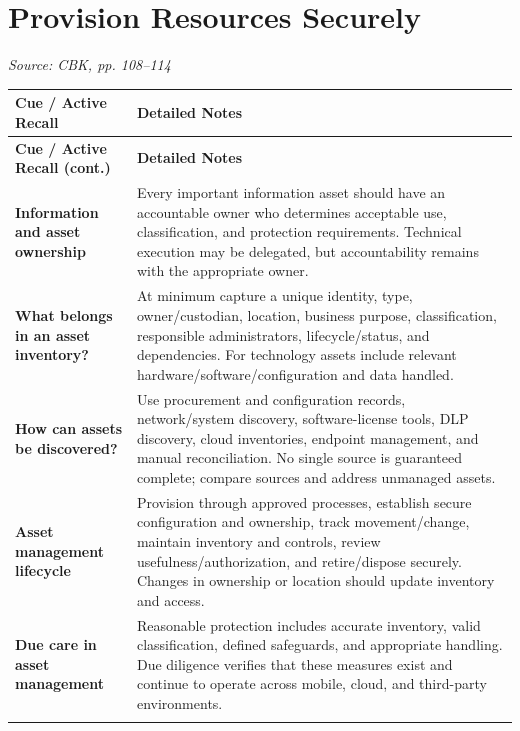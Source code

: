 \documentclass[10pt,letterpaper]{article}
\makeatletter
\newenvironment{cornell}
{\rowcolors{2}{white}{notebg}\begin{longtable}{@{}>{\raggedright\arraybackslash\columncolor{cuebg}\color{navy}\bfseries}p{0.285\textwidth}>{\raggedright\arraybackslash}p{0.65\textwidth}@{}}
\rowcolor{navy}\color{white}\textbf{Cue / Active Recall} & \color{white}\textbf{Detailed Notes}\\ \hline\endfirsthead
\rowcolor{navy}\color{white}\textbf{Cue / Active Recall (cont.)} & \color{white}\textbf{Detailed Notes}\\ \hline\endhead}{\end{longtable}}
\newcommand{\noterow}[2]{#1 & #2\\\arrayrulecolor{line}\hline}
\newcommand{\source}[1]{\par{\footnotesize\color{teal}\textit{Source: CBK, #1}}\par}
\makeatother
\begin{document}
\section{\color{navy}Provision Resources Securely}
\source{pp. 108--114}
\begin{cornell}
\noterow{Information and asset ownership}{Every important information asset should have an accountable owner who determines acceptable use, classification, and protection requirements. Technical execution may be delegated, but accountability remains with the appropriate owner.}
\noterow{What belongs in an asset inventory?}{At minimum capture a unique identity, type, owner/custodian, location, business purpose, classification, responsible administrators, lifecycle/status, and dependencies. For technology assets include relevant hardware/software/configuration and data handled.}
\noterow{How can assets be discovered?}{Use procurement and configuration records, network/system discovery, software-license tools, DLP discovery, cloud inventories, endpoint management, and manual reconciliation. No single source is guaranteed complete; compare sources and address unmanaged assets.}
\noterow{Asset management lifecycle}{Provision through approved processes, establish secure configuration and ownership, track movement/change, maintain inventory and controls, review usefulness/authorization, and retire/dispose securely. Changes in ownership or location should update inventory and access.}
\noterow{Due care in asset management}{Reasonable protection includes accurate inventory, valid classification, defined safeguards, and appropriate handling. Due diligence verifies that these measures exist and continue to operate across mobile, cloud, and third-party environments.}
\end{cornell}
\end{document}
